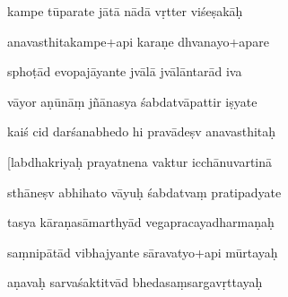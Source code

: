 \documentclass[article,12pt,a4paper]{memoir}%
\newcounter{parCount}
\begin{document}
	  
	  \pstart \leavevmode%
	kampe tūparate jātā nādā vṛtter viśeṣakāḥ 
	{}
	\pend%
      

	  
	  \pstart {} anavasthitakampe+api karaṇe dhvanayo+apare 
	{}
	\pend%
      

	  
	  \pstart \leavevmode%
	sphoṭād evopajāyante jvālā jvālāntarād iva 
	{}
	\pend%
      

	  
	  \pstart {} vāyor aṇūnāṃ jñānasya śabdatvāpattir iṣyate 
	{}
	\pend%
      

	  
	  \pstart \leavevmode%
	kaiś cid darśanabhedo hi pravādeṣv anavasthitaḥ 
	{}
	\pend%
      

	  
	  \pstart {} [labdhakriyaḥ prayatnena vaktur icchānuvartinā 
	{}
	\pend%
      

	  
	  \pstart \leavevmode%
	sthāneṣv abhihato vāyuḥ śabdatvaṃ pratipadyate 
	{}
	\pend%
      

	  
	  \pstart {} tasya kāraṇasāmarthyād vegapracayadharmaṇaḥ 
	{}
	\pend%
      

	  
	  \pstart \leavevmode%
	saṃnipātād vibhajyante sāravatyo+api mūrtayaḥ 
	{}
	\pend%
      

	  
	  \pstart {} aṇavaḥ sarvaśaktitvād bhedasaṃsargavṛttayaḥ 
	{}
	\pend%
      
\end{document}
